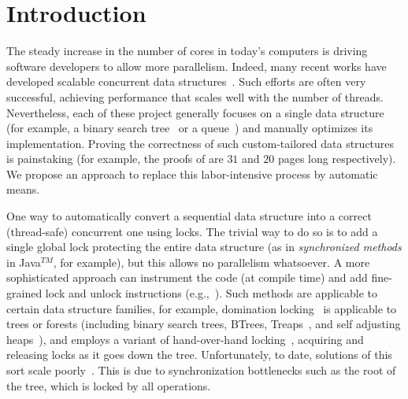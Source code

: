 
\section{Introduction} \label{sec:intro}

The steady increase in the number of  cores in today's computers is driving software developers to allow more parallelism.
Indeed, many recent works have developed scalable concurrent data
structures~\cite{ArbelA2014,DrachslerVY2014,NatarajanM2014,BrownER2014,CrainGR2013,BraginskyP2012,
AfekKKMT2012,EllenFRB2010,BronsonCCO2010,HerlihyLLS2007,Michael:1996}.
Such efforts are often very successful, achieving performance that scales well
with the number of threads.
Nevertheless, each of these project generally focuses on a single data structure
(for example, a binary search tree~\cite{ArbelA2014} or a queue~\cite{Michael:1996}) and manually optimizes its implementation.
Proving the correctness of such custom-tailored data structures is painstaking
(for example, the proofs of \cite{BraginskyP2012,EllenFRB2010} are $31$ and $20$ pages long
respectively). We propose an approach to replace this labor-intensive process by automatic means.

One way to automatically convert a sequential data structure into a correct (thread-safe) concurrent one using locks.
The trivial way to do so is to add a single global lock protecting the entire data structure
(as in \emph{synchronized methods} in Java$^{TM}$, for example), but this allows no parallelism whatsoever.
A more sophisticated approach can instrument the code (at compile time) and add
fine-grained lock and unlock instructions (e.g.,~\cite{Gueta2011,MZGB:POPL06}). Such
methods are applicable to certain data structure families, for example,
domination locking~\cite{Gueta2011} is applicable to trees or forests
(including binary search trees, BTrees, Treaps~\cite{AragonS1989}, and self adjusting heaps~\cite{Sleator:SAH1986:SAH}),
and employs a variant of hand-over-hand locking~\cite{SilberschatzK1980},
acquiring and releasing locks as it goes down the tree.
Unfortunately, to date, solutions of this sort scale poorly~\cite{Gueta2011}.
This is due to synchronization bottlenecks such as the root of the tree,
which is locked by all operations.

